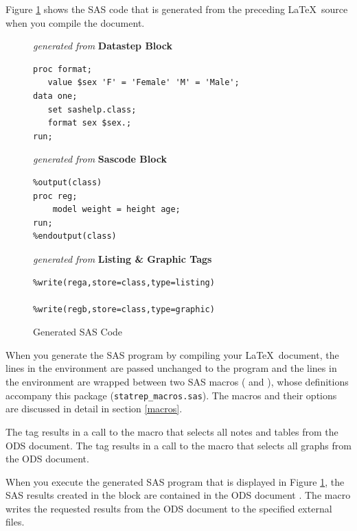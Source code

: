 \documentclass[article,oneside]{memoir}
\begin{document}
  Figure \ref{fig:sgp} shows the SAS code that is generated
  from the preceding \LaTeX\ source when you compile the document.

\begin{figure}[H]
\begin{framed}
\begin{snugshade}
{\hfil\emph{generated from }\textbf{Datastep Block}\hfil}
\begin{verbatim}
proc format;
   value $sex 'F' = 'Female' 'M' = 'Male';
data one;
   set sashelp.class;
   format sex $sex.;
run;
\end{verbatim}
\end{snugshade}
\begin{snugshade}
{\hfil\emph{generated from }\textbf{Sascode Block}\hfil}
\begin{verbatim}
%output(class)
proc reg;
    model weight = height age;
run;
%endoutput(class)
\end{verbatim}
\end{snugshade}
\begin{snugshade}
{\hfil\emph{generated from }\textbf{Listing \& Graphic Tags}\hfil}
\begin{verbatim}
%write(rega,store=class,type=listing)

%write(regb,store=class,type=graphic)
\end{verbatim}
\end{snugshade}
\end{framed}
\caption{Generated SAS Code}\label{fig:sgp}
\end{figure}

  When you generate the SAS program by compiling your \LaTeX\ document,
  the lines in the  environment are passed unchanged to the program
  and
  the lines in the 
  environment are wrapped between two SAS macros ( and ),
  whose definitions accompany this package (\texttt{statrep\_macros.sas}).
  The macros and their options are discussed in detail in section \ref{macros}.

  The  tag results in a call to the  macro that selects all notes and tables from the ODS document.
  The  tag results in a call to the  macro that selects all graphs from the ODS document.

  When you execute the generated SAS program that is displayed
  in Figure \ref{fig:sgp}, the SAS results created in the  block are contained
  in the ODS document . The  macro writes the requested results from the ODS document
  to the specified
  external files.
\end{document}
